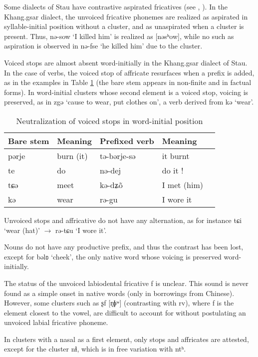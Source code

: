 \documentclass[oneside,a4paper,11pt]{article}
\newcommand{\ipa}[1]{{\phon #1}} %
\begin{document}
Some dialects of Stau have contrastive aspirated fricatives (see \citealt{jackson00puxi},  \citealt{jacques11lingua}). In the Khang.gsar dialect, the unvoiced fricative phonemes are realized as aspirated in syllable-initial position without a cluster, and as unaspirated when a cluster is present. Thus, \ipa{nə-sow} `I killed him' is realized as [nəsʰow], while no such as aspiration is observed in \ipa{nə-fse} `he killed him' due to the cluster.

Voiced stops are almost absent word-initially in the Khang.gsar dialect of Stau. In the case of verbs, the voiced stop of affricate resurfaces when a prefix is added, as in the examples in Table \ref{tab:voiced} (the bare stem appears in non-finite and in factual forms). In word-initial clusters whose second element is a voiced stop, voicing is preserved, as in \ipa{zgə} `cause to wear, put clothes on', a verb derived from \ipa{kə} `wear'. 

 \begin{table}[H]
 \caption{Neutralization of voiced stops in word-initial position} \label{tab:voiced} \centering 
\begin{tabular}{lllll}
\toprule
Bare stem & Meaning & Prefixed verb & Meaning \\
\midrule
\ipa{pərje} & burn (it) &\ipa{tə-bərje-sə} & it burnt \\
\ipa{te} & do &\ipa{nə-dej} & do it !\\
\ipa{tɕə} & meet &\ipa{kə-dʑõ} & I met (him)\\
\ipa{kə} &wear &\ipa{rə-gu} & I wore it \\
\bottomrule
\end{tabular}
\end{table}
Unvoiced stops and affricative do not have any alternation, as for instance \ipa{tɕi} `wear (hat)' $\rightarrow$ \ipa{rə-tɕu} `I wore it'.

Nouns do not have any productive prefix, and thus the contrast has been lost, except for   \ipa{bəlʚ} `cheek', the only native word whose voicing is preserved word-initially.

 
The status of the unvoiced labiodental fricative \ipa{f} is unclear. This sound is never found as a simple onset in native words (only in borrowings from Chinese). However, some clusters such as  \ipa{ʂf} [r̥ɸʷ] (contrasting with \ipa{rv}), where \ipa{f} is the element closest to the vowel, are difficult to account for without postulating an unvoiced labial fricative phoneme.
 
 In clusters with a nasal as a first element, only stops and affricates are attested, except for the cluster \ipa{nɬ}, which is in free variation with \ipa{ntʰ}.
 
\end{document}
